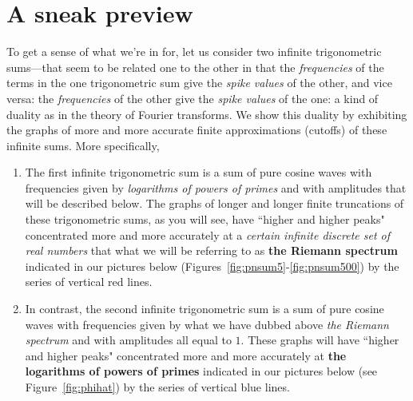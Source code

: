 \documentclass[openany]{book}
\theoremstyle{plain}
\theoremstyle{definition}
\begin{document}
\chapter{ A sneak preview}\label{snpr}

To get a sense of what we're in for, let us consider two infinite trigonometric sums---that seem to be related one to the other in that the {\it frequencies} of the terms in the one trigonometric sum give the {\it spike values} of the other, and vice versa:   the {\it frequencies} of the other give the {\it spike values} of the one: a kind of duality as in the theory of Fourier transforms. We show this duality by exhibiting the graphs of more and more accurate finite approximations (cutoffs) of these infinite sums. More specifically,

\begin{enumerate}\item The first infinite trigonometric sum is a sum of pure cosine waves with frequencies given by {\it logarithms of powers of primes} and with amplitudes that will be described below. The graphs of longer and longer finite truncations of these trigonometric sums, as you will see, have ``higher and higher peaks" concentrated more and more accurately at a  {\it certain infinite discrete set of real numbers} that what we will be referring to as {\bf the Riemann spectrum} indicated in our pictures below (Figures~\ref{fig:pnsum5}-\ref{fig:pnsum500}) by the series of vertical red lines.

\item  In contrast, the second infinite trigonometric sum is a sum of pure cosine waves with frequencies given by what we have dubbed above {\it the Riemann spectrum} and with amplitudes all equal to $1$. These graphs will have ``higher and higher peaks" concentrated more and more accurately at {\bf the logarithms of powers of primes} indicated in our pictures below (see Figure~\ref{fig:phihat}) by the series of vertical blue lines.

               \end{enumerate}
\end{document}

